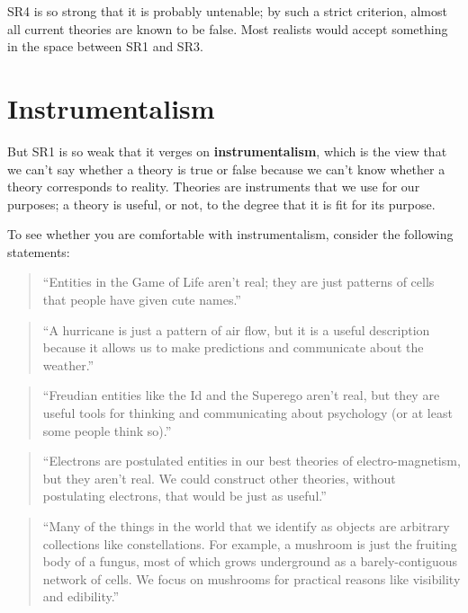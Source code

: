 \documentclass[10pt]{book}
\begin{document}
SR4 is so strong that it is probably untenable; by such a strict
criterion, almost all current theories are known to be false.
Most realists would accept something in the space
between SR1 and SR3.


\section{Instrumentalism}

But SR1 is so weak that it verges on {\bf instrumentalism}, which is
the view that we can't say whether a theory is true or false because
we can't know whether a theory corresponds to reality.  Theories are
instruments that we use for our purposes; a theory is useful, or not,
to the degree that it is fit for its purpose.

To see whether you are comfortable with instrumentalism, consider
the following statements:

\begin{quote}
``Entities in the Game of Life aren't real; they are just patterns of
  cells that people have given cute names.''
\end{quote}

\begin{quote}
``A hurricane is just a pattern of air flow, but it is a useful
  description because it allows us to make predictions and communicate
  about the weather.''
\end{quote}

\begin{quote}
``Freudian entities like the Id and the Superego aren't real, but they
  are useful tools for thinking and communicating about psychology (or
  at least some people think so).''
\end{quote}

\begin{quote}
``Electrons are postulated entities in our best theories of
electro-magnetism, but they aren't real.  We could construct
other theories, without postulating electrons, that would be
just as useful.''
\end{quote}

\begin{quote}
``Many of the things in the world that we identify as objects are
  arbitrary collections like constellations.  For example, a mushroom
  is just the fruiting body of a fungus, most of which grows
  underground as a barely-contiguous network of cells.  We focus
  on mushrooms for practical reasons like visibility and edibility.''
\end{quote}
\end{document}
